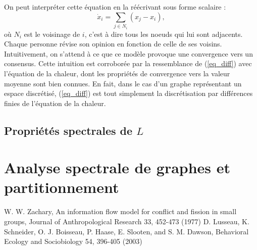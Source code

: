 \documentclass[12pt]{article}
\begin{document}
      On peut interpréter cette équation en la réécrivant sous forme scalaire :
      \begin{equation}
        \label{eq_diff_scal}
        \dot {x}_i = \sum_{j \in N_i} (x_j - x_i),
      \end{equation}
      où $N_i$ est le voisinage de $i$, c'est à dire tous les noeuds
      qui lui sont adjacents. Chaque personne révise son opinion en
      fonction de celle de ses voisins. Intuitivement, on s'attend à
      ce que ce modèle provoque une convergence vers un
      consensus. Cette intuition est corroborée par la ressemblance de
      (\ref{eq_diff}) avec l'équation de la chaleur, dont les
      propriétés de convergence vers la valeur moyenne sont bien
      connues. En fait, dans le cas d'un graphe représentant un espace
      discrétisé, (\ref{eq_diff}) est tout simplement la
      discrétisation par différences finies de l'équation de la
      chaleur.

      \subsection{Propriétés spectrales de $L$}
      \section{Analyse spectrale de graphes et partitionnement}

      \begin{thebibliography}{2}
       W. W. Zachary, An information flow model for conflict and fission in small groups, Journal of Anthropological Research 33, 452-473 (1977)
       D. Lusseau, K. Schneider, O. J. Boisseau, P. Haase, E. Slooten, and S. M. Dawson, Behavioral Ecology and Sociobiology 54, 396-405 (2003)
      \end{thebibliography}
\end{document}
